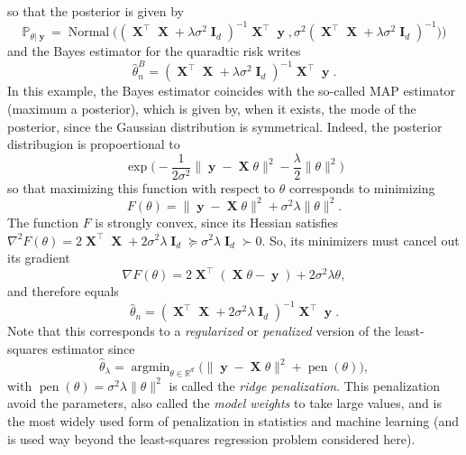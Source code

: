 \documentclass[
	fontsize=11pt, %
	twoside=false, %
	numbers=noenddot, %
]{kaobook}
\DeclareMathOperator{\bI}{{\boldsymbol I}}
\DeclareMathOperator{\bX}{{\boldsymbol X}}
\DeclareMathOperator{\by}{{\boldsymbol y}}
\DeclareMathOperator{\pen}{pen}
\DeclareMathOperator{\nor}{Normal}
\DeclareMathOperator*{\argmin}{argmin}
\renewcommand{\P}{\mathbb P}
\newcommand{\R}{\mathbb R}
\newcommand{\wh}{\widehat}
\newcommand{\mgeq}{\succcurlyeq}
\newcommand{\norm}[1]{\| #1 \|}
\begin{document}
so that the posterior is given by
\begin{equation*}
	\P_{\theta | \by} = \nor \Big( (\bX^\top \bX  + \lambda \sigma^2 \bI_d)^{-1} \bX^\top \by,
	\sigma^2 (\bX^\top \bX + \lambda \sigma^2 \bI_d)^{-1} \Big)
	 \Big)
\end{equation*}
and the Bayes estimator for the quaradtic risk writes
\begin{equation*}
	\wh \theta_n^B = (\bX^\top \bX  + \lambda \sigma^2 \bI_d)^{-1} \bX^\top \by.
\end{equation*}
In this example, the Bayes estimator coincides with the so-called MAP estimator (maximum a posterior), which is given by, when it exists, the mode of the posterior, since the Gaussian distribution is symmetrical.
Indeed, the posterior distribugion is propoertional to
\begin{equation*}
	\exp \Big( -\frac{1}{2 \sigma^2} \norm{\by - \bX \theta}^2 - \frac{\lambda}{2} \norm{\theta}^2 \Big)
\end{equation*}
so that maximizing this function with respect to $\theta$ corresponds to minimizing
\begin{equation*}
	F(\theta) = \norm{\by - \bX \theta}^2 + \sigma^2 \lambda \norm{\theta}^2.
\end{equation*}
The function $F$ is strongly convex, since its Hessian satisfies $\nabla^2 F(\theta) = 2 \bX^\top \bX + 2\sigma^2 \lambda \bI_d \mgeq \sigma^2 \lambda \bI_d \succ 0$.
So, its minimizers must cancel out its gradient
\begin{equation*}
	\nabla F(\theta) = 2 \bX^\top (\bX \theta - \by) + 2 \sigma^2 \lambda \theta,
\end{equation*}
and therefore equals
\begin{equation*}
	\wh \theta_n = (\bX^\top \bX + 2 \sigma^2 \lambda \bI_d)^{-1} \bX^\top \by.
\end{equation*}
Note that this corresponds to a \emph{regularized} or \emph{penalized} version of the least-squares estimator 
since
\begin{equation*}
	\wh \theta_\lambda = \argmin_{\theta \in \R^d} \Big( \norm{\by - \bX \theta}^2 + \pen(\theta) \Big),
\end{equation*}
with $\pen(\theta) = \sigma^2 \lambda \norm{\theta}^2$ is called the \emph{ridge penalization}.
This penalization avoid the parameters, also called the \emph{model weights} to take large values, and is the most widely used form of penalization in statistics and machine learning (and is used way beyond the least-squares regression problem considered here).
\end{document}
